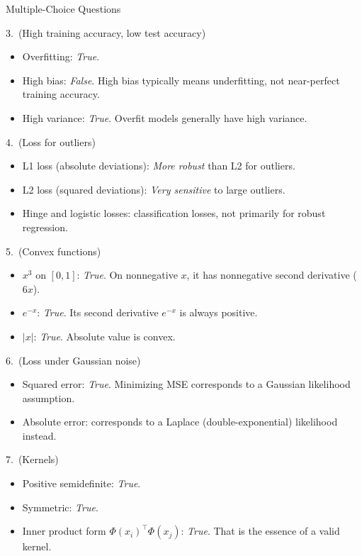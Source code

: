 \documentclass{article}
\begin{document}
\begin{exercise}{Multiple-Choice Questions}
\begin{solution}
    3.\ (High training accuracy, low test accuracy)
    \begin{itemize}
      \item Overfitting: \emph{True}.
      \item High bias: \emph{False}. High bias typically means underfitting, not near-perfect training accuracy.
      \item High variance: \emph{True}. Overfit models generally have high variance.
    \end{itemize}

    4.\ (Loss for outliers)
    \begin{itemize}
      \item L1 loss (absolute deviations): \emph{More robust} than L2 for outliers.
      \item L2 loss (squared deviations): \emph{Very sensitive} to large outliers.
      \item Hinge and logistic losses: classification losses, not primarily for robust regression.
    \end{itemize}

    5.\ (Convex functions)
    \begin{itemize}
      \item $x^3$ on $[0,1]$: \emph{True}. On nonnegative $x$, it has nonnegative second derivative ($6x$).
      \item $e^{-x}$: \emph{True}. Its second derivative $e^{-x}$ is always positive.
      \item $|x|$: \emph{True}. Absolute value is convex.
    \end{itemize}

    6.\ (Loss under Gaussian noise)
    \begin{itemize}
      \item Squared error: \emph{True}. Minimizing MSE corresponds to a Gaussian likelihood assumption.
      \item Absolute error: corresponds to a Laplace (double-exponential) likelihood instead.
    \end{itemize}

    7.\ (Kernels)
    \begin{itemize}
      \item Positive semidefinite: \emph{True}.
      \item Symmetric: \emph{True}.
      \item Inner product form $\Phi(x_i)^\top \Phi(x_j)$: \emph{True}. That is the essence of a valid kernel.
    \end{itemize}
  \end{solution}
\end{exercise}
\end{document}
